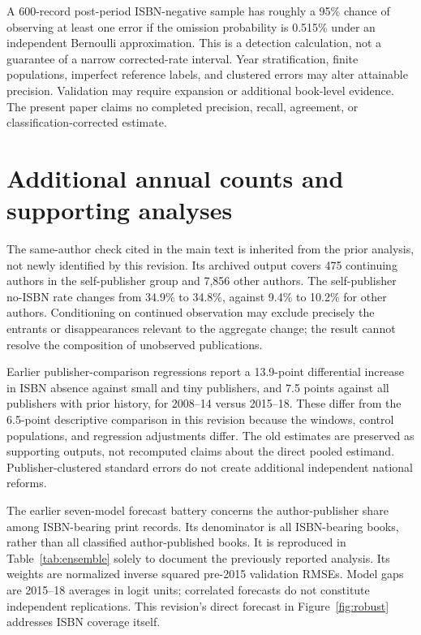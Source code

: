 \documentclass[11pt]{article}
\begin{document}
A 600-record post-period ISBN-negative sample has roughly a 95\% chance of observing at least one error if the omission probability is 0.515\% under an independent Bernoulli approximation. This is a detection calculation, not a guarantee of a narrow corrected-rate interval. Year stratification, finite populations, imperfect reference labels, and clustered errors may alter attainable precision. Validation may require expansion or additional book-level evidence. The present paper claims no completed precision, recall, agreement, or classification-corrected estimate.

\section{Additional annual counts and supporting analyses}



The same-author check cited in the main text is inherited from the prior analysis, not newly identified by this revision. Its archived output covers 475 continuing authors in the self-publisher group and 7,856 other authors. The self-publisher no-ISBN rate changes from 34.9\% to 34.8\%, against 9.4\% to 10.2\% for other authors. Conditioning on continued observation may exclude precisely the entrants or disappearances relevant to the aggregate change; the result cannot resolve the composition of unobserved publications.

Earlier publisher-comparison regressions report a 13.9-point differential increase in ISBN absence against small and tiny publishers, and 7.5 points against all publishers with prior history, for 2008--14 versus 2015--18. These differ from the 6.5-point descriptive comparison in this revision because the windows, control populations, and regression adjustments differ. The old estimates are preserved as supporting outputs, not recomputed claims about the direct pooled estimand. Publisher-clustered standard errors do not create additional independent national reforms.



The earlier seven-model forecast battery concerns the author-publisher share among ISBN-bearing print records. Its denominator is all ISBN-bearing books, rather than all classified author-published books. It is reproduced in Table~\ref{tab:ensemble} solely to document the previously reported analysis. Its weights are normalized inverse squared pre-2015 validation RMSEs. Model gaps are 2015--18 averages in logit units; correlated forecasts do not constitute independent replications. This revision's direct forecast in Figure~\ref{fig:robust} addresses ISBN coverage itself.
\end{document}
